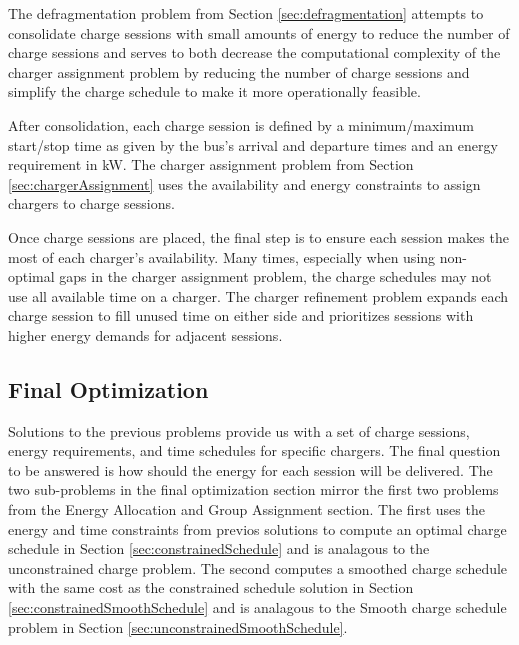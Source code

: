 \par The defragmentation problem from Section \ref{sec:defragmentation} attempts to consolidate charge sessions with small amounts of energy to reduce the number of charge sessions and serves to both decrease the computational complexity of the charger assignment problem by reducing the number of charge sessions and simplify the charge schedule to make it more operationally feasible.  
\par After consolidation, each charge session is defined by a minimum/maximum start/stop time as given by the bus's arrival and departure times and an energy requirement in kW. The charger assignment problem from Section \ref{sec:chargerAssignment} uses the availability and energy constraints to assign chargers to charge sessions.  
\par Once charge sessions are placed, the final step is to ensure each session makes the most of each charger's availability. Many times, especially when using non-optimal gaps in the charger assignment problem, the charge schedules may not use all available time on a charger. The charger refinement problem expands each charge session to fill unused time on either side and prioritizes sessions with higher energy demands for adjacent sessions.  

\subsection{Final Optimization} 
Solutions to the previous problems provide us with a set of charge sessions, energy requirements, and time schedules for specific chargers. The final question to be answered is how should the energy for each session will be delivered. The two sub-problems in the final optimization section mirror the first two problems from the Energy Allocation and Group Assignment section. The first uses the energy and time constraints from previos solutions to compute an optimal charge schedule in Section \ref{sec:constrainedSchedule} and is analagous to the unconstrained charge problem. The second computes a smoothed charge schedule with the same cost as the constrained schedule solution in Section \ref{sec:constrainedSmoothSchedule} and is analagous to the Smooth charge schedule problem in Section \ref{sec:unconstrainedSmoothSchedule}.

 
 
 

